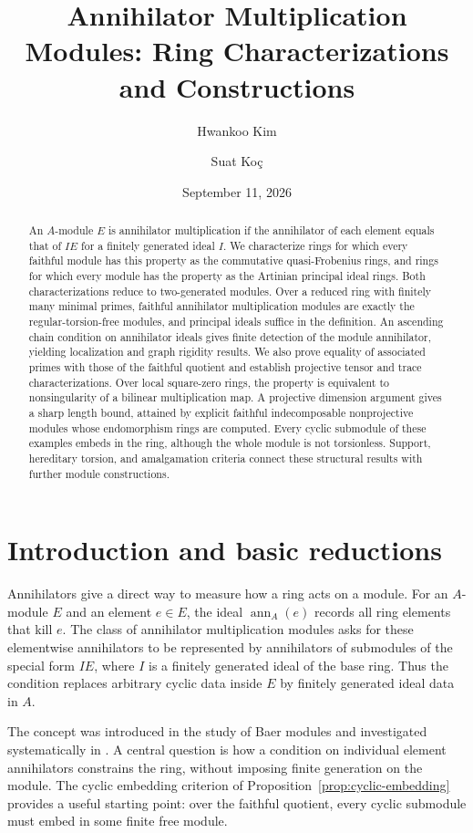 \documentclass[11pt]{amsart}
\title[Annihilator Multiplication Modules]
{Annihilator Multiplication Modules: Ring Characterizations and Constructions}
\author[Kim]{Hwankoo Kim}
\author[Ko\c{c}]{Suat Ko\c{c}}
\date{September 11, 2026}
\theoremstyle{plain}
\theoremstyle{definition}
\theoremstyle{remark}
\newcommand{\ann}{\operatorname{ann}}
\numberwithin{equation}{section}
\begin{document}
\begin{abstract}
An $A$-module $E$ is annihilator multiplication if the annihilator of each
element equals that of $IE$ for a finitely generated ideal $I$.
We characterize rings for which every faithful module has this property as
the commutative quasi-Frobenius rings, and rings for which every module has
the property as the Artinian principal ideal rings. Both characterizations
reduce to two-generated modules. Over a reduced ring with finitely many
minimal primes, faithful annihilator multiplication modules are exactly the
regular-torsion-free modules, and principal ideals suffice in the definition.
An ascending chain condition on annihilator ideals gives finite detection
of the module annihilator, yielding localization and graph rigidity results.
We also prove equality of associated primes with those of the faithful
quotient and establish projective tensor and trace characterizations.
Over local square-zero rings, the property is equivalent to nonsingularity
of a bilinear multiplication map. A projective dimension argument gives a
sharp length bound, attained by explicit faithful indecomposable
nonprojective modules whose endomorphism rings are computed.
Every cyclic submodule of these examples embeds in the ring, although the
whole module is not torsionless.
Support, hereditary torsion, and amalgamation criteria connect these
structural results with further module constructions.
\end{abstract}

\maketitle

\section{Introduction and basic reductions}

Annihilators give a direct way to measure how a ring acts on a module. For an
$A$-module $E$ and an element $e\in E$, the ideal $\ann_A(e)$ records all ring
elements that kill $e$. The class of annihilator multiplication modules asks
for these elementwise annihilators to be represented by annihilators of
submodules of the special form $IE$, where $I$ is a finitely generated ideal of
the base ring. Thus the condition replaces arbitrary cyclic data inside $E$ by
finitely generated ideal data in $A$.

The concept was introduced in the study of Baer modules
\cite{JTK22} and investigated systematically in \cite{KocAMM}.
A central question is how a condition on individual element annihilators
constrains the ring, without imposing finite generation on the module.
The cyclic embedding criterion of Proposition~\ref{prop:cyclic-embedding}
provides a useful starting point: over the faithful quotient, every cyclic
submodule must embed in some finite free module.
\end{document}
